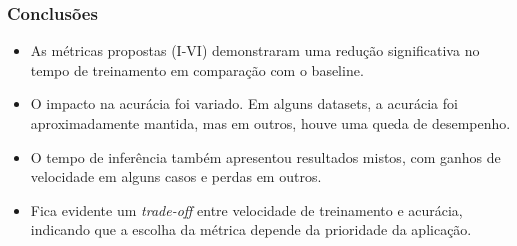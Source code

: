 \begin{frame}
    \frametitle{Conclusões}
    \begin{itemize}
        \item As métricas propostas (I-VI) demonstraram uma redução significativa no tempo de treinamento em comparação com o baseline.
        \item O impacto na acurácia foi variado. Em alguns datasets, a acurácia foi aproximadamente mantida, mas em outros, houve uma queda de desempenho.
        \item O tempo de inferência também apresentou resultados mistos, com ganhos de velocidade em alguns casos e perdas em outros.
        \item Fica evidente um \textit{trade-off} entre velocidade de treinamento e acurácia, indicando que a escolha da métrica depende da prioridade da aplicação.
    \end{itemize}
\end{frame}
